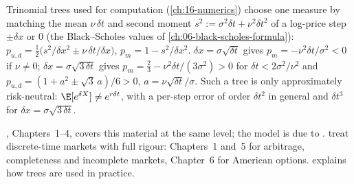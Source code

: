 \begin{remark}\label{rem:bin-trinomial-trees}
Trinomial trees used for computation (\cref{ch:16-numerics}) choose one measure by matching
the mean $\nu\,\delta t$ and second moment $s^2:=\sigma^2\delta t+\nu^2\delta t^2$ of a
log-price step $\pm\delta x$ or $0$ (the Black--Scholes values of
\cref{ch:06-black-scholes-formula}): $p_{u,d}=\frac12\big(s^2/\delta x^2\pm\nu\,\delta t/\delta x\big)$,
$p_m=1-s^2/\delta x^2$. $\delta x=\sigma\sqrt{\delta t}$ gives $p_m=-\nu^2\delta t/\sigma^2<0$
if $\nu\ne0$; $\delta x=\sigma\sqrt{3\,\delta t}$ gives $p_m=\frac23-\nu^2\delta t/(3\sigma^2)>0$
for $\delta t<2\sigma^2/\nu^2$ and $p_{u,d}=(1+a^2\pm\sqrt3\,a)/6>0$, $a=\nu\sqrt{\delta t}/\sigma$.
Such a tree is only approximately risk-neutral: $\E[e^{\delta X}]\ne e^{r\delta t}$, with a
per-step error of order $\delta t^2$ in general and $\delta t^3$ for $\delta x=\sigma\sqrt{3\,\delta t}$.
\end{remark}

\furtherreading
\textcite{shreve1}, Chapters~1--4, covers this material at the same level; the model is due
to \textcite{crr1979}. \textcite{follmer-schied} treat discrete-time markets with full
rigour: Chapters~1 and~5 for arbitrage, completeness and incomplete markets, Chapter~6 for
American options. \textcite{hull} explains how trees are used in practice.
